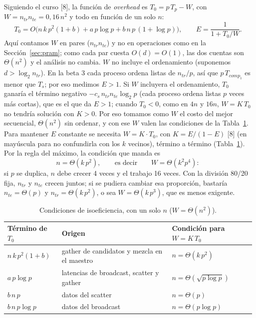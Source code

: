 \documentclass[11pt,a4paper]{article}
\newcommand{\ntr}{n_{tr}}
\newcommand{\nte}{n_{te}}
\begin{document}
Siguiendo el curso [8], la función de \textit{overhead} es $T_0 = p\,T_p - W$, con $W = \ntr\nte = 0{,}16\,n^2$ y todo en función de un solo $n$:
\[
T_0 = O\big(n\, k\, p^2 (1 + b) + a\,p\log p + b\,n\,p\,(1 + \log p)\big),
\qquad E = \frac{1}{1 + T_0/W}.
\]
Aquí contamos $W$ en pares ($\ntr\nte$) y no en operaciones como en la Sección~\ref{sec:pram}; como cada par cuesta $O(d) = O(1)$, las dos cuentas son $\Theta(n^2)$ y el análisis no cambia. $W$ no incluye el ordenamiento (suponemos $d > \log_2\ntr$). En la beta 3 cada proceso ordena listas de $\ntr/p$, así que $p\,T_{comp_1}$ es menor que $T_s$; por eso medimos $E > 1$. Si $W$ incluyera el ordenamiento, $T_0$ ganaría el término negativo $-c_s\,\ntr\nte\log_2 p$ (cada proceso ordena listas $p$ veces más cortas), que es el que da $E > 1$; cuando $T_0 < 0$, como en $4n$ y $16n$, $W = K\,T_0$ no tendría solución con $K > 0$. Por eso tomamos como $W$ el costo del mejor secuencial, $\Theta(n^2)$ sin ordenar, y con ese $W$ valen las condiciones de la Tabla~\ref{tab:iso}.
Para mantener $E$ constante se necesita $W = K\cdot T_0$, con $K = E/(1-E)$ [8] (en mayúscula para no confundirla con los $k$ vecinos), término a término (Tabla~\ref{tab:iso}). Por la regla del máximo, la condición que manda es
\[
n = \Theta(k\,p^2), \qquad\text{es decir}\qquad W = \Theta(k^2 p^4):
\]
si $p$ se duplica, $n$ debe crecer 4 veces y el trabajo 16 veces. Con la división 80/20 fija, $\ntr$ y $\nte$ crecen juntos; si se pudiera cambiar esa proporción, bastaría $\nte = \Theta(p)$ y $\ntr = \Theta(k\,p^2)$, o sea $W = \Theta(k\,p^3)$, que es menos exigente.

\begin{table}[!htb]
\centering
\small
\begin{tabular}{lll}
\toprule
\textbf{Término de $T_0$} & \textbf{Origen} & \textbf{Condición para $W = K\,T_0$} \\
\midrule
$n\,k\,p^2(1+b)$ & gather de candidatos y mezcla en el maestro & $n = \Theta(k\,p^2)$ \\
$a\,p\log p$ & latencias de broadcast, scatter y gather & $n = \Theta(\sqrt{p\log p})$ \\
$b\,n\,p$ & datos del scatter & $n = \Theta(p)$ \\
$b\,n\,p\log p$ & datos del broadcast & $n = \Theta(p\log p)$ \\
\bottomrule
\end{tabular}
\caption{Condiciones de isoeficiencia, con un solo $n$ ($W = \Theta(n^2)$).}
\label{tab:iso}
\end{table}
\end{document}
